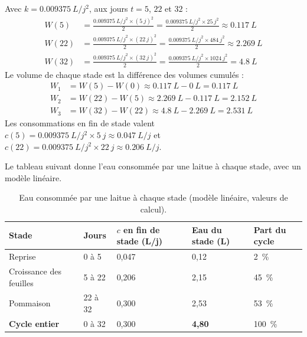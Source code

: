 \begin{demonstration}
Avec $k = \qty{0,009375}{L/j^2}$, aux jours $t = 5$, $22$ et $32$ :
\begin{align*}
W(5) &= \frac{\qty{0,009375}{L/j^2}\times(\qty{5}{j})^{2}}{2} = \frac{\qty{0,009375}{L/j^2}\times\qty{25}{j^2}}{2} \approx \qty{0,117}{L}\\
W(22) &= \frac{\qty{0,009375}{L/j^2}\times(\qty{22}{j})^{2}}{2} = \frac{\qty{0,009375}{L/j^2}\times\qty{484}{j^2}}{2} \approx \qty{2,269}{L}\\
W(32) &= \frac{\qty{0,009375}{L/j^2}\times(\qty{32}{j})^{2}}{2} = \frac{\qty{0,009375}{L/j^2}\times\qty{1024}{j^2}}{2} = \qty{4,8}{L}
\end{align*}
Le volume de chaque stade est la différence des volumes cumulés :
\begin{align*}
W_1 &= W(5) - W(0) \approx \qty{0,117}{L} - \qty{0}{L} = \qty{0,117}{L}\\
W_2 &= W(22) - W(5) \approx \qty{2,269}{L} - \qty{0,117}{L} = \qty{2,152}{L}\\
W_3 &= W(32) - W(22) \approx \qty{4,8}{L} - \qty{2,269}{L} = \qty{2,531}{L}
\end{align*}
Les consommations en fin de stade valent $c(5) = \qty{0,009375}{L/j^2}\times\qty{5}{j} \approx \qty{0,047}{L/j}$ et $c(22) = \qty{0,009375}{L/j^2}\times\qty{22}{j} \approx \qty{0,206}{L/j}$.
\end{demonstration}

Le tableau suivant donne l'eau consommée par une laitue à chaque stade, avec un modèle linéaire.

\begin{table}[H]
\centering
\small
\renewcommand{\arraystretch}{1.1}
\begin{tabularx}{\textwidth}{|>{\raggedright\arraybackslash}p{4.4cm}|Y|Y|Y|Y|}
\hline
\textbf{Stade} & \textbf{Jours} & \textbf{$c$ en fin de stade (\unit{L/j})} & \textbf{Eau du stade (\unit{L})} & \textbf{Part du cycle} \\
\hline
Reprise & 0 à 5 & 0,047 & 0,12 & \qty{2}{\percent} \\
\hline
Croissance des feuilles & 5 à 22 & 0,206 & 2,15 & \qty{45}{\percent} \\
\hline
Pommaison & 22 à 32 & 0,300 & 2,53 & \qty{53}{\percent} \\
\hline
\textbf{Cycle entier} & 0 à 32 & 0,300 & \textbf{4,80} & \qty{100}{\percent} \\
\hline
\end{tabularx}
\caption{Eau consommée par une laitue à chaque stade (modèle linéaire, valeurs de calcul).}
\end{table}

